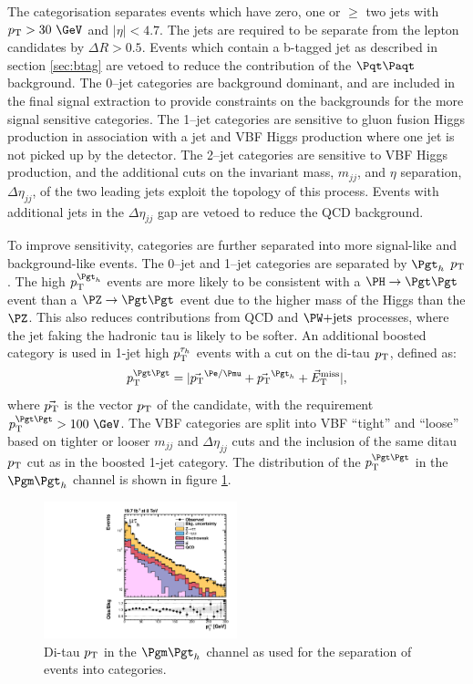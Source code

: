 The categorisation separates events which have zero, one or $\geq$ two jets with $\pt > 30~\GeV$
and $|\eta| < 4.7$. The jets are required to be separate from the lepton
candidates by $\Delta R > 0.5$. Events which contain a b-tagged jet as described in section
\ref{sec:btag} are vetoed to reduce the contribution of the $\ttbar$ background. 
The 0--jet categories are background dominant, and are included in the final
signal extraction to provide constraints on the backgrounds for the more signal
sensitive categories. The 1--jet categories are sensitive to gluon fusion Higgs
production in association with a jet and \ac{VBF} Higgs production where one jet is
not picked up by the detector. The 2--jet categories are sensitive to
\ac{VBF} Higgs production, and the additional cuts on the invariant mass, $m_{jj}$,
and $\eta$ separation, $\Delta\eta_{jj}$, of the two leading
jets exploit the topology of this process. Events with additional jets in
the $\Delta \eta_{jj}$ gap are vetoed to reduce the QCD background.

To improve sensitivity, categories are further separated into more signal-like
and background-like events. The 0--jet and 1--jet categories are separated by
$\Pgth$ $p_{\mathrm{T}}$. The high $\pt^{\Pgth}$ events are more likely to be
consistent with a $\HToTauTau$ event than a $\ZToTauTau$ event due to the higher
mass of the Higgs than the $\PZ$. This also reduces contributions from QCD
and $\WJets$ processes, where the jet faking the hadronic tau is likely to be
softer. An additional boosted category is used in 1-jet high $p_{\mathrm{T}}^{\tau_{h}}$
events with a cut on the di-tau $p_{\mathrm{T}}$, defined as:
\begin{equation}
\pt^{\Pgt\Pgt} = |\vec{\pt}^{\Pe/\Pmu} + \vec{\pt}^{\Pgth}+\vecMET|,
\end{equation}
where $\vec{p_{\mathrm{T}}}$ is the vector $p_{\mathrm{T}}$ of the candidate, with the requirement 
$\pt^{\Pgt\Pgt}>100~\GeV$. The VBF categories are split into VBF
``tight'' and ``loose'' based on tighter or looser $m_{jj}$ and
$\Delta\eta_{jj}$ cuts and the inclusion of the same ditau $p_{\mathrm{T}}$ cut as in the
boosted 1-jet category. The distribution of the $\pt^{\Pgt\Pgt}$ in the
$\mutau$ channel is shown in figure \ref{fig:ditaupt}. 

\begin{figure}[htb]
\begin{center}
    \includegraphics[width=0.5\textwidth]
      {plots/htt-sm/pt_tt_inclusive_mt_2012_log.pdf}
\end{center}
\caption{
 Di-tau $p_{\mathrm{T}}$ in the $\mutau$ channel as used for the separation of events into
 categories. 
}
\label{fig:ditaupt}
\end{figure}

